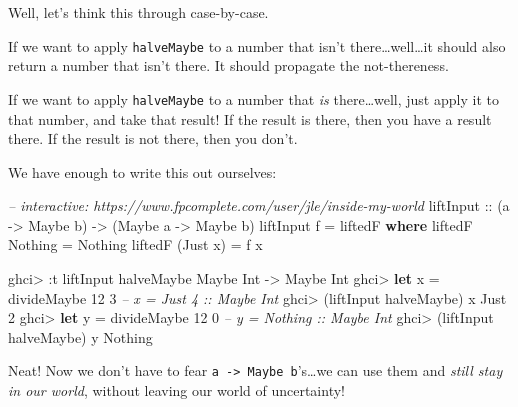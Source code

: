 \documentclass[]{article}
\newenvironment{Shaded}{}{}
\newcommand{\KeywordTok}[1]{\textcolor[rgb]{0.00,0.44,0.13}{\textbf{{#1}}}}
\newcommand{\DataTypeTok}[1]{\textcolor[rgb]{0.56,0.13,0.00}{{#1}}}
\newcommand{\DecValTok}[1]{\textcolor[rgb]{0.25,0.63,0.44}{{#1}}}
\newcommand{\CommentTok}[1]{\textcolor[rgb]{0.38,0.63,0.69}{\textit{{#1}}}}
\newcommand{\OtherTok}[1]{\textcolor[rgb]{0.00,0.44,0.13}{{#1}}}
\newcommand{\FunctionTok}[1]{\textcolor[rgb]{0.02,0.16,0.49}{{#1}}}
\newcommand{\NormalTok}[1]{{#1}}
\begin{document}
Well, let's think this through case-by-case.

If we want to apply \texttt{halveMaybe} to a number that isn't
there\ldots{}well\ldots{}it should also return a number that isn't
there. It should propagate the not-thereness.

If we want to apply \texttt{halveMaybe} to a number that \emph{is}
there\ldots{}well, just apply it to that number, and take that result!
If the result is there, then you have a result there. If the result is
not there, then you don't.

We have enough to write this out ourselves:

\begin{Shaded}
\begin{Highlighting}[]
\CommentTok{-- interactive: https://www.fpcomplete.com/user/jle/inside-my-world}
\OtherTok{liftInput ::} \NormalTok{(a }\OtherTok{->} \DataTypeTok{Maybe} \NormalTok{b) }\OtherTok{->} \NormalTok{(}\DataTypeTok{Maybe} \NormalTok{a }\OtherTok{->} \DataTypeTok{Maybe} \NormalTok{b)}
\NormalTok{liftInput f }\FunctionTok{=} \NormalTok{liftedF}
  \KeywordTok{where}
    \NormalTok{liftedF }\DataTypeTok{Nothing}  \FunctionTok{=} \DataTypeTok{Nothing}
    \NormalTok{liftedF (}\DataTypeTok{Just} \NormalTok{x) }\FunctionTok{=} \NormalTok{f x}
\end{Highlighting}
\end{Shaded}

\begin{Shaded}
\begin{Highlighting}[]
\NormalTok{ghci}\FunctionTok{>} \FunctionTok{:}\NormalTok{t liftInput halveMaybe}
\DataTypeTok{Maybe} \DataTypeTok{Int} \OtherTok{->} \DataTypeTok{Maybe} \DataTypeTok{Int}
\NormalTok{ghci}\FunctionTok{>} \KeywordTok{let} \NormalTok{x }\FunctionTok{=} \NormalTok{divideMaybe }\DecValTok{12} \DecValTok{3}     \CommentTok{-- x = Just 4 :: Maybe Int}
\NormalTok{ghci}\FunctionTok{>} \NormalTok{(liftInput halveMaybe) x}
\DataTypeTok{Just} \DecValTok{2}
\NormalTok{ghci}\FunctionTok{>} \KeywordTok{let} \NormalTok{y }\FunctionTok{=} \NormalTok{divideMaybe }\DecValTok{12} \DecValTok{0}     \CommentTok{-- y = Nothing :: Maybe Int}
\NormalTok{ghci}\FunctionTok{>} \NormalTok{(liftInput halveMaybe) y}
\DataTypeTok{Nothing}
\end{Highlighting}
\end{Shaded}

Neat! Now we don't have to fear
\texttt{a\ -\textgreater{}\ Maybe\ b}'s\ldots{}we can use them and
\emph{still stay in our world}, without leaving our world of
uncertainty!
\end{document}
